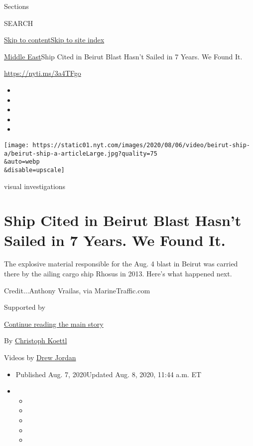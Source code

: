 Sections

SEARCH

\protect\hyperlink{site-content}{Skip to
content}\protect\hyperlink{site-index}{Skip to site index}

\href{/section/world/middleeast}{Middle East}\textbar{}Ship Cited in
Beirut Blast Hasn't Sailed in 7 Years. We Found It.

\href{https://nyti.ms/3a4TFgo}{https://nyti.ms/3a4TFgo}

\begin{itemize}
\item
\item
\item
\item
\item
\end{itemize}

\texttt{[image: https://static01.nyt.com/images/2020/08/06/video/beirut-ship-a/beirut-ship-a-articleLarge.jpg?quality=75\\\&auto=webp\\\&disable=upscale]}

visual investigations

\hypertarget{ship-cited-in-beirut-blast-hasnt-sailed-in-7-years-we-found-it}{%
\section{Ship Cited in Beirut Blast Hasn't Sailed in 7 Years. We Found
It.}\label{ship-cited-in-beirut-blast-hasnt-sailed-in-7-years-we-found-it}}

The explosive material responsible for the Aug. 4 blast in Beirut was
carried there by the ailing cargo ship Rhosus in 2013. Here's what
happened next.

Credit...Anthony Vrailas, via MarineTraffic.com

Supported by

\protect\hyperlink{after-sponsor}{Continue reading the main story}

By \href{https://www.nytimes.com/by/christoph-koettl}{Christoph Koettl}

Videos by \href{https://www.nytimes.com/by/drew-jordan}{Drew Jordan}

\begin{itemize}
\item
  Published Aug. 7, 2020Updated Aug. 8, 2020, 11:44 a.m. ET
\item
  \begin{itemize}
  \item
  \item
  \item
  \item
  \item
  \end{itemize}
\end{itemize}

